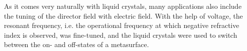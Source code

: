 \documentclass[a4paper,11pt]{article}
\begin{document}
As it comes very naturally with liquid crystals, many applications also include the tuning of the director field with electric field. 
With the help of voltage, the resonant frequency, i.e. the operational frequency at which negative refractive index is observed, was fine-tuned, and the liquid crystals were used to switch between the on- and off-states of a metasurface. 


% 
% 
% 
% 
\end{document}
